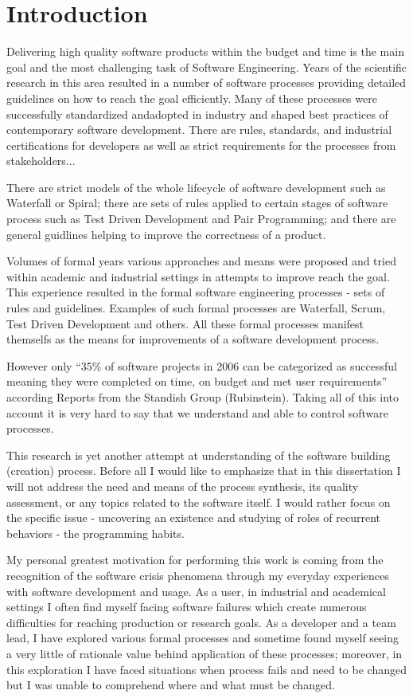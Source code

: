 \chapter{Introduction}
Delivering high quality software products within the budget and time is the main goal and the most challenging task of Software Engineering. Years of the scientific research in
this area resulted in a number of software processes providing detailed guidelines on how to reach the goal efficiently. Many of these processes were successfully standardized
andadopted in industry and shaped best practices of contemporary software development. There are rules, standards, and industrial certifications for developers as well as strict 
requirements for the processes from stakeholders... 

There are strict models of the whole lifecycle of software development such as Waterfall or Spiral; there are sets of rules applied to certain stages of software process such as Test Driven Development and Pair Programming; and there are general guidlines helping to improve the correctness of a product.

Volumes of formal years various approaches and means were proposed and tried within academic and industrial settings in attempts to improve reach the goal. This experience resulted in the formal software engineering processes - sets of rules and guidelines. Examples of such formal processes are  Waterfall, Scrum, Test Driven Development and others. All these formal processes manifest themselfs as the means for improvements of a software development process. 

However only ``35\% of software projects in 2006 can be categorized as successful meaning they were completed on time, on budget and met user requirements'' according Reports from the Standish Group (Rubinstein). Taking all of this into account it is very hard to say that we understand and able to control software processes.

This research is yet another attempt at understanding of the software building (creation) process. Before all I would like to emphasize that in this dissertation I will not address the need and means of the process synthesis, its quality assessment, or any topics related to the software itself. I would rather focus on the specific issue - uncovering an existence and studying of roles of recurrent behaviors - the programming habits. 

My personal greatest motivation for performing this work is coming from the recognition of the software crisis phenomena through my everyday experiences with software development and usage. As a user, in industrial and academical settings I often find myself facing software failures which create numerous difficulties for reaching production or research goals. As a developer and a team lead, I have explored various formal processes and sometime found myself seeing a very little of rationale value behind application of these processes; moreover, in this exploration I have faced situations when process fails and need to be changed but I was unable to comprehend where and what must be changed. 

